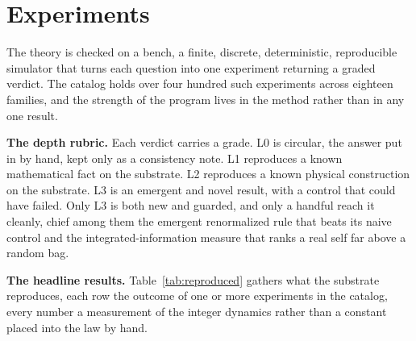 \section{Experiments}

The theory is checked on a bench, a finite, discrete, deterministic, reproducible simulator that turns each question into one experiment returning a graded verdict. The catalog holds over four hundred such experiments across eighteen families, and the strength of the program lives in the method rather than in any one result.

\textbf{The depth rubric.} Each verdict carries a grade. L0 is circular, the answer put in by hand, kept only as a consistency note. L1 reproduces a known mathematical fact on the substrate. L2 reproduces a known physical construction on the substrate. L3 is an emergent and novel result, with a control that could have failed. Only L3 is both new and guarded, and only a handful reach it cleanly, chief among them the emergent renormalized rule that beats its naive control and the integrated-information measure that ranks a real self far above a random bag.

\textbf{The headline results.} Table~\ref{tab:reproduced} gathers what the substrate reproduces, each row the outcome of one or more experiments in the catalog, every number a measurement of the integer dynamics rather than a constant placed into the law by hand.

